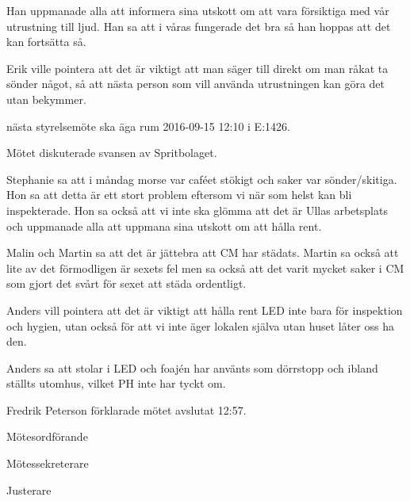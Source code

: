 \documentclass[10pt]{article}
\def\mo{Fredrik Peterson}
\def\ms{Erik Månsson}
\def\ji{Johan Persson}
\begin{document}
\begin{paragrafer}
Han uppmanade alla att informera sina utskott om att vara försiktiga med vår utrustning till ljud. Han sa att i våras fungerade det bra så han hoppas att det kan fortsätta så.

Erik ville pointera att det är viktigt att man säger till direkt om man råkat ta sönder något, så att nästa person som vill använda utrustningen kan göra det utan bekymmer.

\Mba nästa styrelsemöte ska äga rum 2016-09-15 12:10 i E:1426.

\Ibfu

Mötet diskuterade svansen av Spritbolaget.

Stephanie sa att i måndag morse var caféet stökigt och saker var sönder/skitiga. Hon sa att detta är ett stort problem eftersom vi när som helst kan bli inspekterade. Hon sa också att vi inte ska glömma att det är Ullas arbetsplats och uppmanade alla att uppmana sina utskott om att hålla rent.

Malin och Martin sa att det är jättebra att CM har städats. Martin sa också att lite av det förmodligen är sexets fel men sa också att det varit mycket saker i CM som gjort det svårt för sexet att städa ordentligt.

Anders vill pointera att det är viktigt att hålla rent LED inte bara för inspektion och hygien, utan också för att vi inte äger lokalen själva utan huset låter oss ha den.

Anders sa att stolar i LED och foajén har använts som dörrstopp och ibland ställts utomhus, vilket PH inte har tyckt om.

\newpage
{}
{\mo} förklarade mötet avslutat 12:57.

\end{paragrafer}

\hidesignfoot
\begin{signatures}{3}
\signature{\mo}{Mötesordförande}
\signature{\ms}{Mötessekreterare}
\signature{\ji}{Justerare}
\end{signatures}
\end{document}

